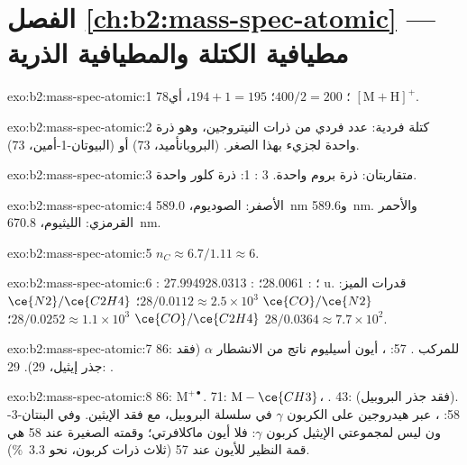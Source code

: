 \section*{الفصل \ref{ch:b2:mass-spec-atomic} --- مطيافية الكتلة والمطيافية الذرية}

\begin{solution}{exo:b2:mass-spec-atomic:1}
78؛ $400/2 = 200$؛ $194 + 1 = 195$، أي $[\mathrm M + \mathrm H]^+$.
\end{solution}

\begin{solution}{exo:b2:mass-spec-atomic:2}
كتلة فردية: عدد فردي من ذرات النيتروجين، وهو ذرة واحدة لجزيء بهذا الصغر.  (البروبانأميد، 73)
أو  (البيوتان-1-أمين، 73).
\end{solution}

\begin{solution}{exo:b2:mass-spec-atomic:3}
متقاربتان: ذرة بروم واحدة. 3 : 1: ذرة كلور واحدة.
\end{solution}

\begin{solution}{exo:b2:mass-spec-atomic:4}
الأصفر: الصوديوم، \qty{589.0}{nm} و\qty{589.6}{nm}. والأحمر القرمزي: الليثيوم، \qty{670.8}{nm}.
\end{solution}

\begin{solution}{exo:b2:mass-spec-atomic:5}
$n_C \approx 6.7/1.11 \approx 6$.
\end{solution}

\begin{solution}{exo:b2:mass-spec-atomic:6}
: 27.9949؛ : 28.0061؛ : 28.0313 u. قدرات الميز: $\ce{CO}/\ce{N2}$ $28/0.0112
\approx 2.5 \times 10^3$؛ $\ce{N2}/\ce{C2H4}$ $28/0.0252 \approx 1.1 \times 10^3$؛ $\ce{CO}/\ce{C2H4}$
$28/0.0364 \approx 7.7 \times 10^2$.
\end{solution}

\begin{solution}{exo:b2:mass-spec-atomic:7}
86:  للمركب . 57: ، أيون أسيليوم ناتج من الانشطار $\alpha$ (فقد
جذر إيثيل، 29). 29: .
\end{solution}

\begin{solution}{exo:b2:mass-spec-atomic:8}
86: $\mathrm M^{+\bullet}$. 71: $\mathrm M - \ce{CH3}$،  . 43: 
(فقد جذر البروبيل). 58: ، عبر هيدروجين على الكربون $\gamma$
في سلسلة البروبيل، مع فقد الإيثين. وفي البنتان-3-ون ليس لمجموعتي الإيثيل كربون $\gamma$: فلا
أيون ماكلافرتي؛ وقمته الصغيرة عند 58 هي قمة النظير  للأيون عند 57 (ثلاث ذرات كربون،
نحو 3.3~\%).
\end{solution}

